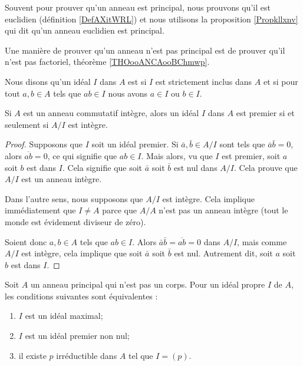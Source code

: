 Souvent pour prouver qu'un anneau est principal, nous prouvons qu'il est euclidien (définition \ref{DefAXitWRL}) et nous utilisons la proposition \ref{Propkllxnv} qui dit qu'un anneau euclidien est principal.

Une manière de prouver qu'un anneau n'est pas principal est de prouver qu'il n'est pas factoriel, théorème \ref{THOooANCAooBChmwp}.

\begin{definition}
    Nous disons qu'un idéal \( I\) dans \( A\) est  si \( I\) est strictement inclus dans \( A\) et si pour tout \( a,b\in A\) tels que \( ab\in I\) nous avons \( a\in I\) ou \( b\in I\).
\end{definition}

\begin{proposition}     \label{PROPooHABIooBZZQMj}
    Si \( A\) est un anneau commutatif intègre, alors un idéal \( I\) dans \( A\) est premier si et seulement si \( A/I\) est intègre. 
\end{proposition}

\begin{proof}
    Supposons que \( I\) soit un idéal premier. Si \( \bar a,\bar b\in A/I\)  sont tels que \( \bar a\bar b=0\), alors \( \overline{ ab }=0\), ce qui signifie que \( ab\in I\). Mais alors, vu que \( I\) est premier, soit \( a\) soit \( b\) est dans \( I\). Cela signifie que soit \( \bar a\) soit \( \bar b\) est nul dans \( A/I\). Cela prouve que \( A/I\) est un anneau intègre.

    Dans l'autre sens, nous supposons que \( A/I\) est intègre. Cela implique immédiatement que \( I\neq A\) parce que \( A/A\) n'est pas un anneau intègre (tout le monde est évidement diviseur de zéro).

    Soient donc \( a,b\in A\) tels que \( ab\in I\). Alors \( \bar a\bar b= \overline{ ab }=0\) dans \( A/I\), mais comme \( A/I\) est intègre, cela implique que soit \( \bar a\) soit \( \bar b\) est nul. Autrement dit, soit \( a\) soit \( b\) est dans \( I\).
\end{proof}

\begin{proposition} \label{PropomqcGe}
    Soit \( A\) un anneau principal qui n'est pas un corps. Pour un idéal propre \( I\) de \( A\), les conditions suivantes sont équivalentes :
    \begin{enumerate}
        \item       \label{ITEMooNOVFooEHtcwE}
            \( I\) est un idéal maximal;
        \item       \label{ITEMooMQWVooNocVEU}
            \( I\) est un idéal premier non nul;
        \item       \label{ITEMooJBXGooEISNuW}
            il existe \( p\) irréductible dans \( A\) tel que \( I=(p)\).
    \end{enumerate}
\end{proposition}

